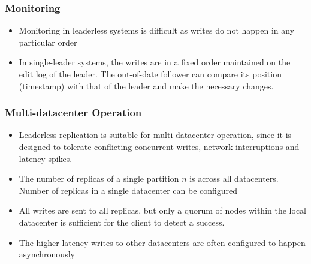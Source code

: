 \documentclass{article}
\begin{document}
\subsubsection{Monitoring}
\begin{itemize}
    \item Monitoring in leaderless systems is difficult as writes do not happen in any particular order 
    
    \item In single-leader systems, the writes are in a fixed order maintained on the edit log of the leader. The out-of-date follower can compare its position (timestamp) with that of the leader and make the necessary changes.
\end{itemize}

\subsubsection{Multi-datacenter Operation}
\begin{itemize}
    \item Leaderless replication is suitable for multi-datacenter operation, since it is designed to tolerate conflicting concurrent writes, network interruptions and latency spikes.
    
    \item The number of replicas of a single partition $n$ is across all datacenters. Number of replicas in a single datacenter can be configured
    
    \item All writes are sent to all replicas, but only a quorum of nodes within the local datacenter is sufficient for the client to detect a success. 
    
    \item The higher-latency writes to other datacenters are often configured to happen asynchronously
\end{itemize}
\end{document}
